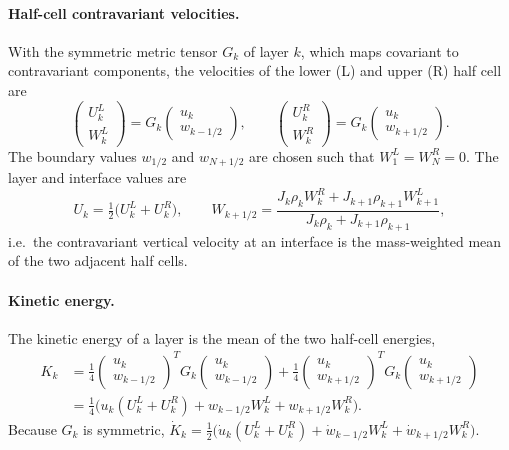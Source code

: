 \documentclass[11pt,a4paper]{article}
\begin{document}
\paragraph{Half-cell contravariant velocities.}
With the symmetric metric tensor $G_k$ of layer $k$, which maps covariant to
contravariant components, the velocities of the lower (L) and upper (R) half
cell are
\begin{equation}
  \begin{pmatrix} U^L_k\\ W^L_k\end{pmatrix}
    = G_k\begin{pmatrix} u_k\\ w_{k-1/2}\end{pmatrix},\qquad
  \begin{pmatrix} U^R_k\\ W^R_k\end{pmatrix}
    = G_k\begin{pmatrix} u_k\\ w_{k+1/2}\end{pmatrix}.
\end{equation}
The boundary values $w_{1/2}$ and $w_{N+1/2}$ are chosen such that
$W^L_1 = W^R_N = 0$. The layer and interface values are
\begin{equation}
  U_k = \tfrac12\bigl(U^L_k + U^R_k\bigr),\qquad
  W_{k+1/2} = \frac{J_k\rho_k W^R_k + J_{k+1}\rho_{k+1}W^L_{k+1}}
                   {J_k\rho_k + J_{k+1}\rho_{k+1}},
  \label{eq:Wavg}
\end{equation}
i.e.\ the contravariant vertical velocity at an interface is the
mass-weighted mean of the two adjacent half cells.

\paragraph{Kinetic energy.}
The kinetic energy of a layer is the mean of the two half-cell energies,
\begin{equation}
\begin{split}
  K_k &= \frac14\begin{pmatrix} u_k\\ w_{k-1/2}\end{pmatrix}^{\!T}
          G_k\begin{pmatrix} u_k\\ w_{k-1/2}\end{pmatrix}
      + \frac14\begin{pmatrix} u_k\\ w_{k+1/2}\end{pmatrix}^{\!T}
          G_k\begin{pmatrix} u_k\\ w_{k+1/2}\end{pmatrix}\\
      &= \frac14\bigl(u_k(U^L_k+U^R_k) + w_{k-1/2}W^L_k + w_{k+1/2}W^R_k\bigr).
\end{split}
  \label{eq:Kdisc}
\end{equation}
Because $G_k$ is symmetric,
$\dot K_k = \tfrac12\bigl(\dot u_k(U^L_k+U^R_k) + \dot w_{k-1/2}W^L_k
  + \dot w_{k+1/2}W^R_k\bigr)$.
\end{document}
